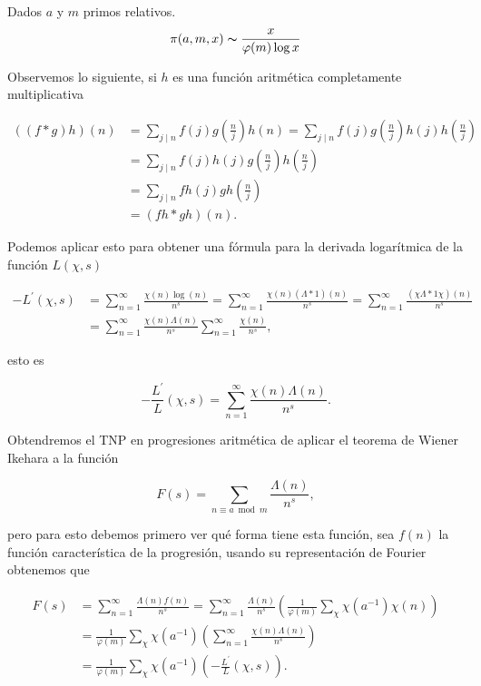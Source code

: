 \begin{theorem}
Dados $a$ y $m$ primos relativos.
    $$\pi(a,m,x)\thicksim \frac{x}{\varphi(m)\log x}$$    
\end{theorem}

Observemos lo siguiente, si $h$ es una función aritmética completamente multiplicativa

\begin{align*}
    ((f*g)h)(n)&=\sum_{j\mid n}f(j)g\left(\frac{n}{j}\right)h(n)=\sum_{j\mid n}f(j)g\left(\frac{n}{j}\right)h\left(j\right)h\left(\frac{n}{j}\right)\\
    &=\sum_{j\mid n}f(j)h\left(j\right)g\left(\frac{n}{j}\right)h\left(\frac{n}{j}\right)\\
    &=\sum_{j\mid n}fh(j)gh\left(\frac{n}{j}\right)\\
    &=(fh*gh)(n)
.\end{align*}

Podemos aplicar esto para obtener una fórmula para la derivada logarítmica de la función $L(\chi,s)$

\begin{align*}
    -L^{\prime}(\chi,s)&=\sum_{n=1}^{\infty} \frac{\chi(n)\log(n)}{n^s}=\sum_{n=1}^{\infty} \frac{\chi(n)(\Lambda*1)(n)}{n^s}=\sum_{n=1}^{\infty} \frac{(\chi\Lambda*1\chi)(n) }{n^s}\\
    &=\sum_{n=1}^{\infty} \frac{\chi(n)\Lambda(n)}{n^s}\sum_{n=1}^{\infty} \frac{\chi(n)}{n^s},
\end{align*}

esto es

$$\boxed{-\frac{L^{\prime}}{L}(\chi,s)=\sum_{n=1}^{\infty} \frac{\chi(n)\Lambda(n)}{n^s}}.$$

Obtendremos el TNP en progresiones aritmética de aplicar el teorema de Wiener Ikehara a la función

$$F(s)=\sum_{n\equiv a \bmod{m}}\frac{\Lambda(n)}{n^s},$$

pero para esto debemos primero ver qué forma tiene esta función, sea $f(n)$ la función característica de la progresión, usando su representación de Fourier obtenemos que

\begin{align*}
    F(s)&=\sum_{n=1}^{\infty}\frac{\Lambda(n)f(n)}{n^s}=\sum_{n=1}^{\infty} \frac{\Lambda(n)}{n^s}\left(\frac{1}{\varphi(m)}\sum_\chi \chi(a^{-1})\chi(n)\right)\\
    &=\frac{1}{\varphi(m)}\sum_\chi\chi(a^{-1})\left(\sum_{n=1}^{\infty} \frac{\chi(n)\Lambda(n)}{n^s}\right)\\
    &=\frac{1}{\varphi(m)}\sum_\chi\chi(a^{-1})\left(-\frac{L^{\prime}}{L}(\chi,s)\right)
.\end{align*}

